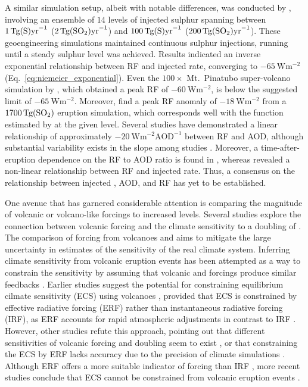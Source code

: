 \documentclass[draft]{agujournal2019}
\begin{document}
A similar simulation setup, albeit with notable differences, was conducted by
, involving an ensemble of \(14\) levels of injected sulphur
spanning between \(\SI{1}{\tera\gram(\ce{S})\mathrm{yr}^{-1}}\)
(\(\SI{2}{\tera\gram(\ce{SO2})\mathrm{yr}^{-1}}\)) and
\(\SI{100}{\tera\gram(\ce{S})\mathrm{yr}^{-1}}\)
(\(\SI{200}{\tera\gram(\ce{SO2})\mathrm{yr}^{-1}}\)). These geoengineering simulations
maintained continuous sulphur injections, running until a steady sulphur level was
achieved. Results indicated an inverse exponential relationship between RF and injected
 rate, converging to \(\SI{-65}{\watt\metre^{-2}}\)
(Eq.~\ref{eq:niemeier_exponential}). Even the \(100\times\) Mt.\ Pinatubo super-volcano
simulation by , which obtained a peak RF of
\(\SI{-60}{\watt\metre^{-2}}\), is below the suggested limit of
\(\SI{-65}{\watt\metre^{-2}}\). Moreover,  find a peak RF anomaly of
\(\SI{-18}{\watt\metre^{-2}}\) from a \(\SI{1700}{\tera\gram(\ce{SO2})}\) eruption
simulation, which corresponds well with the function estimated by 
at the given  level. Several studies have demonstrated a linear relationship of
approximately \(-\SI{20}{\watt\metre^{-2}\mathrm{AOD}^{-1}}\) between RF and AOD,
although substantial variability exists in the slope among studies
\cite{mills2017,hansen2005,gregory2016,marshall2020,pitari2016b}. Moreover, a
time-after-eruption dependence on the RF to AOD ratio is found in ,
whereas  revealed a non-linear relationship between RF and injected
 rate. Thus, a consensus on the relationship between injected , AOD, and
RF has yet to be established.

One avenue that has garnered considerable attention is comparing the magnitude of
volcanic or volcano-like forcings to increased  levels. Several studies explore
the connection between volcanic forcing and the climate sensitivity to a doubling of
\cite{boer2007,marvel2016,merlis2014,ollila2016,richardson2019,salvi2022,wigley2005}.
The comparison of forcing from volcanoes and  aims to mitigate the large
uncertainty in estimates of the sensitivity of the real climate system. Inferring
climate sensitivity from volcanic eruption events has been attempted as a way to
constrain the sensitivity \cite{boer2007} by assuming that volcanic and 
forcings produce similar feedbacks \cite{pauling2023}. Earlier studies suggest the
potential for constraining equilibrium cilmate sensitivity (ECS) using volcanoes
\cite{bender2010}, provided that ECS is constrained by effective radiative forcing (ERF)
rather than instantaneous radiative forcing (IRF), as ERF accounts for rapid atmospheric
adjustments in contrast to IRF \cite{richardson2019}. However, other studies refute this
approach, pointing out that different sensitivities of volcanic forcing and 
doubling seem to exist \cite{douglass2006}, or that constraining the ECS by ERF lacks
accuracy due to the precision of climate simulations \cite{boer2007,salvi2022}. Although
ERF offers a more suitable indicator of forcing than IRF
\cite{marvel2016,richardson2019}, more recent studies conclude that ECS cannot be
constrained from volcanic eruption events \cite{pauling2023}.
\end{document}

